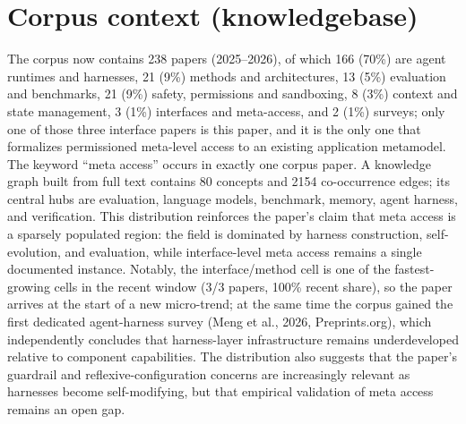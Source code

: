 \documentclass[11pt,a4paper]{article}
\begin{document}
\section{Corpus context (knowledgebase)}
The corpus now contains 238 papers (2025--2026), of which 166 (70\%) are agent runtimes and harnesses, 21 (9\%) methods and architectures, 13 (5\%) evaluation and benchmarks, 21 (9\%) safety, permissions and sandboxing, 8 (3\%) context and state management, 3 (1\%) interfaces and meta-access, and 2 (1\%) surveys; only one of those three interface papers is this paper, and it is the only one that formalizes permissioned meta-level access to an existing application metamodel. The keyword ``meta access'' occurs in exactly one corpus paper. A knowledge graph built from full text contains 80 concepts and 2154 co-occurrence edges; its central hubs are evaluation, language models, benchmark, memory, agent harness, and verification. This distribution reinforces the paper's claim that meta access is a sparsely populated region: the field is dominated by harness construction, self-evolution, and evaluation, while interface-level meta access remains a single documented instance. Notably, the interface/method cell is one of the fastest-growing cells in the recent window (3/3 papers, 100\% recent share), so the paper arrives at the start of a new micro-trend; at the same time the corpus gained the first dedicated agent-harness survey (Meng et al., 2026, Preprints.org), which independently concludes that harness-layer infrastructure remains underdeveloped relative to component capabilities. The distribution also suggests that the paper's guardrail and reflexive-configuration concerns are increasingly relevant as harnesses become self-modifying, but that empirical validation of meta access remains an open gap.
\end{document}
